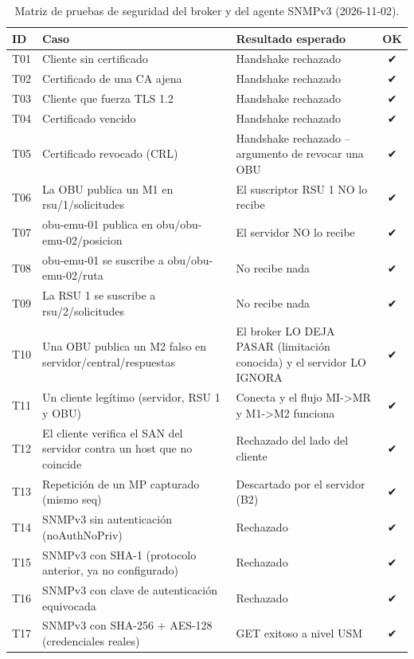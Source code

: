 \begin{table}[H]
\centering
\caption{Matriz de pruebas de seguridad del broker y del agente SNMPv3 (2026-11-02).}
\label{tab:seguridad_matriz}
\small
\begin{tabular}{lp{5cm}p{4cm}c}
\toprule
\textbf{ID} & \textbf{Caso} & \textbf{Resultado esperado} & \textbf{OK} \\
\midrule
T01 & Cliente sin certificado & Handshake rechazado & ✔ \\
T02 & Certificado de una CA ajena & Handshake rechazado & ✔ \\
T03 & Cliente que fuerza TLS 1.2 & Handshake rechazado & ✔ \\
T04 & Certificado vencido & Handshake rechazado & ✔ \\
T05 & Certificado revocado (CRL) & Handshake rechazado -- argumento de revocar una OBU & ✔ \\
T06 & La OBU publica un M1 en rsu/1/solicitudes & El suscriptor RSU 1 NO lo recibe & ✔ \\
T07 & obu-emu-01 publica en obu/obu-emu-02/posicion & El servidor NO lo recibe & ✔ \\
T08 & obu-emu-01 se suscribe a obu/obu-emu-02/ruta & No recibe nada & ✔ \\
T09 & La RSU 1 se suscribe a rsu/2/solicitudes & No recibe nada & ✔ \\
T10 & Una OBU publica un M2 falso en servidor/central/respuestas & El broker LO DEJA PASAR (limitación conocida) y el servidor LO IGNORA & ✔ \\
T11 & Un cliente legítimo (servidor, RSU 1 y OBU) & Conecta y el flujo MI->MR y M1->M2 funciona & ✔ \\
T12 & El cliente verifica el SAN del servidor contra un host que no coincide & Rechazado del lado del cliente & ✔ \\
T13 & Repetición de un MP capturado (mismo seq) & Descartado por el servidor (B2) & ✔ \\
T14 & SNMPv3 sin autenticación (noAuthNoPriv) & Rechazado & ✔ \\
T15 & SNMPv3 con SHA-1 (protocolo anterior, ya no configurado) & Rechazado & ✔ \\
T16 & SNMPv3 con clave de autenticación equivocada & Rechazado & ✔ \\
T17 & SNMPv3 con SHA-256 + AES-128 (credenciales reales) & GET exitoso a nivel USM & ✔ \\
\bottomrule
\end{tabular}
\end{table}
